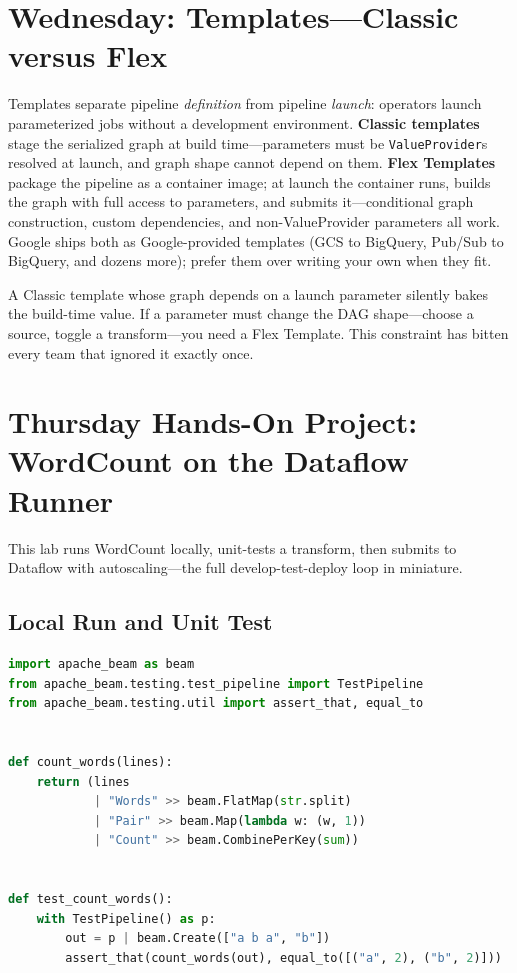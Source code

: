 \section{Wednesday: Templates---Classic versus Flex}

Templates separate pipeline \emph{definition} from pipeline \emph{launch}: operators launch parameterized jobs without a development environment. \textbf{Classic templates} stage the serialized graph at build time---parameters must be \texttt{ValueProvider}s resolved at launch, and graph shape cannot depend on them. \textbf{Flex Templates} package the pipeline as a container image; at launch the container runs, builds the graph with full access to parameters, and submits it---conditional graph construction, custom dependencies, and non-ValueProvider parameters all work. Google ships both as Google-provided templates (GCS to BigQuery, Pub/Sub to BigQuery, and dozens more); prefer them over writing your own when they fit.

\begin{pitfall}
A Classic template whose graph depends on a launch parameter silently bakes the build-time value. If a parameter must change the DAG shape---choose a source, toggle a transform---you need a Flex Template. This constraint has bitten every team that ignored it exactly once.
\end{pitfall}

\section{Thursday Hands-On Project: WordCount on the Dataflow Runner}
This lab runs WordCount locally, unit-tests a transform, then submits to Dataflow with autoscaling---the full develop-test-deploy loop in miniature.

\subsection{Local Run and Unit Test}
\begin{lstlisting}[language=Python,caption={Unit-testing a Beam transform with TestPipeline and PAssert.}]
import apache_beam as beam
from apache_beam.testing.test_pipeline import TestPipeline
from apache_beam.testing.util import assert_that, equal_to


def count_words(lines):
    return (lines
            | "Words" >> beam.FlatMap(str.split)
            | "Pair" >> beam.Map(lambda w: (w, 1))
            | "Count" >> beam.CombinePerKey(sum))


def test_count_words():
    with TestPipeline() as p:
        out = p | beam.Create(["a b a", "b"])
        assert_that(count_words(out), equal_to([("a", 2), ("b", 2)]))
\end{lstlisting}

